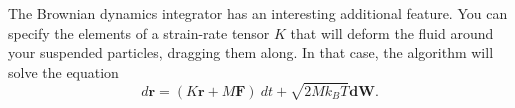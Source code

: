 The Brownian dynamics integrator has an interesting additional feature. You can 
specify the elements of a strain-rate tensor $K$ that will deform the fluid 
around your suspended particles, dragging them along. In that case, the 
algorithm will solve the equation
\begin{equation*}
  d\mathbf{r} = (K\mathbf{r} + M\mathbf{F})\ dt + \sqrt{2 M k_BT} \mathbf{dW}.
\end{equation*}

